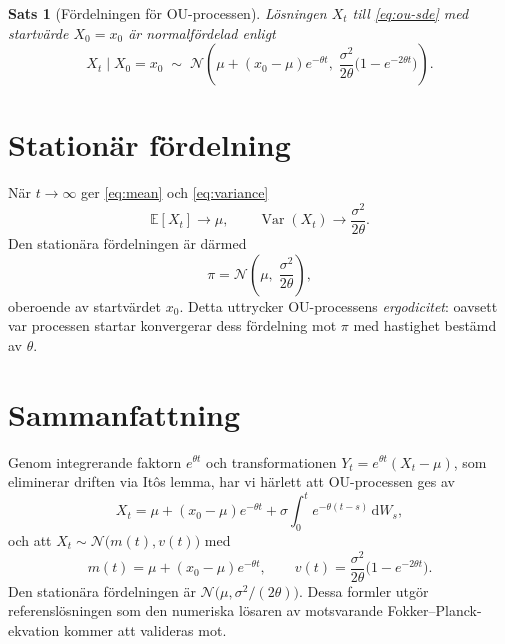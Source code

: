 \documentclass[11pt,a4paper]{article}
\newcommand{\E}{\mathbb{E}}
\newcommand{\Var}{\operatorname{Var}}
\newcommand{\dd}{\mathrm{d}}
\theoremstyle{plain}
\newtheorem{theorem}{Sats}
\theoremstyle{definition}
\theoremstyle{remark}
\begin{document}
\begin{theorem}[Fördelningen för OU-processen]
\label{thm:ou}
Lösningen $X_t$ till \eqref{eq:ou-sde} med startvärde $X_0 = x_0$ är normalfördelad enligt
\begin{equation}
    X_t \mid X_0 = x_0 \;\sim\; \mathcal{N}\!\left(\mu + (x_0 - \mu)e^{-\theta t},\; \frac{\sigma^2}{2\theta}\bigl(1 - e^{-2\theta t}\bigr)\right).
\end{equation}
\end{theorem}

\section{Stationär fördelning}

När $t \to \infty$ ger \eqref{eq:mean} och \eqref{eq:variance}
\[
    \E[X_t] \to \mu, \qquad \Var(X_t) \to \frac{\sigma^2}{2\theta}.
\]
Den stationära fördelningen är därmed
\begin{equation}
    \pi = \mathcal{N}\!\left(\mu,\; \frac{\sigma^2}{2\theta}\right),
    \label{eq:stationary}
\end{equation}
oberoende av startvärdet $x_0$. Detta uttrycker OU-processens \emph{ergodicitet}: oavsett var processen startar konvergerar dess fördelning mot $\pi$ med hastighet bestämd av $\theta$.

\section{Sammanfattning}

Genom integrerande faktorn $e^{\theta t}$ och transformationen $Y_t = e^{\theta t}(X_t - \mu)$, som eliminerar driften via Itôs lemma, har vi härlett att OU-processen ges av
\[
    X_t = \mu + (x_0 - \mu)e^{-\theta t} + \sigma \int_0^t e^{-\theta(t-s)}\,\dd W_s,
\]
och att $X_t \sim \mathcal{N}\bigl(m(t), v(t)\bigr)$ med
\[
    m(t) = \mu + (x_0 - \mu)e^{-\theta t}, \qquad v(t) = \frac{\sigma^2}{2\theta}\bigl(1 - e^{-2\theta t}\bigr).
\]
Den stationära fördelningen är $\mathcal{N}\bigl(\mu, \sigma^2/(2\theta)\bigr)$. Dessa formler utgör referenslösningen som den numeriska lösaren av motsvarande Fokker--Planck-ekvation kommer att valideras mot.
\end{document}
